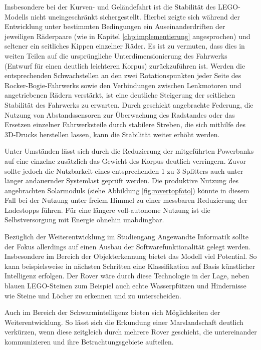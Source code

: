 Insbesondere bei der Kurven- und Geländefahrt ist die Stabilität des LEGO-Modells nicht uneingeschränkt sichergestellt.
Hierbei zeigte sich während der Entwicklung unter bestimmten Bedingungen ein Auseinanderdriften der jeweiligen Räderpaare (wie in Kapitel \ref{chp:implementierung} angesprochen) und seltener ein seitliches Kippen einzelner Räder.
Es ist zu vermuten, dass dies in weiten Teilen auf die ursprüngliche Unterdimensionierung des Fahrwerks (Entwurf für einen deutlich leichteren Korpus) zurückzuführen ist.
Werden die entsprechenden Schwachstellen an den zwei Rotationspunkten jeder Seite des Rocker-Bogie-Fahrwerks sowie den Verbindungen zwischen Lenkmotoren und angetriebenen Rädern verstärkt, ist eine deutliche Steigerung der seitlichen Stabilität des Fahrwerks zu erwarten.
Durch geschickt angebrachte Federung, die Nutzung von Abstandssensoren zur Überwachung des Radstandes oder das Ersetzen einzelner Fahrwerksteile durch stabilere Streben, die sich mithilfe des 3D-Drucks herstellen lassen, kann die Stabilität weiter erhöht werden.

Unter Umständen lässt sich durch die Reduzierung der mitgeführten Powerbanks auf eine einzelne zusätzlich das Gewicht des Korpus deutlich verringern.
Zuvor sollte jedoch die Nutzbarkeit eines entsprechenden 1-zu-3-Splitters auch unter länger andauernder Systemlast geprüft werden.
Die produktive Nutzung des angebrachten Solarmoduls (siehe Abbildung \ref{fig:rovertopfoto}) könnte in diesem Fall bei der Nutzung unter freiem Himmel zu einer messbaren Reduzierung der Ladestopps führen.
Für eine längere voll-autonome Nutzung ist die Selbstversorgung mit Energie ohnehin unabdingbar.

Bezüglich der Weiterentwicklung im Studiengang Angewandte Informatik sollte der Fokus allerdings auf einen Ausbau der Softwarefunktionalität gelegt werden.
Insbesondere im Bereich der Objekterkennung bietet das Modell viel Potential.
So kann beispielsweise in nächsten Schritten eine Klassifikation auf Basis künstlicher Intelligenz erfolgen.
Der Rover wäre durch diese Technologie in der Lage, neben blauen LEGO-Steinen zum Beispiel auch echte Wasserpfützen und Hindernisse wie Steine und Löcher zu erkennen und zu unterscheiden.

Auch im Bereich der Schwarmintelligenz bieten sich Möglichkeiten der Weiterentwicklung.
So lässt sich die Erkundung einer Marslandschaft deutlich verkürzen, wenn diese zeitgleich durch mehrere Rover geschieht, die untereinander kommunizieren und ihre Betrachtungsgebiete aufteilen.